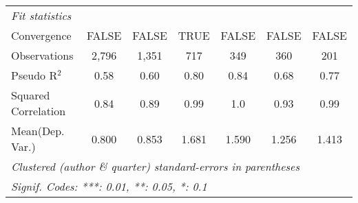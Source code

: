 \begin{tabular}{lcccccc}
   \emph{Fit statistics}\\
   Convergence                                                &FALSE    & FALSE         & TRUE         & FALSE  & FALSE         & FALSE\\  
   Observations                                               & 2,796   & 1,351         & 717          & 349    & 360           & 201\\  
   Pseudo R$^2$                                               & 0.58    & 0.60          & 0.80         & 0.84   & 0.68          & 0.77\\  
   Squared Correlation                                        & 0.84    & 0.89          & 0.99         & 1.0    & 0.93          & 0.99\\  
Mean(Dep. Var.) & 0.800 & 0.853 & 1.681 & 1.590 & 1.256 & 1.413 \\
   \midrule \midrule
   \multicolumn{7}{l}{\emph{Clustered (author \& quarter) standard-errors in parentheses}}\\
   \multicolumn{7}{l}{\emph{Signif. Codes: ***: 0.01, **: 0.05, *: 0.1}}\\
\end{tabular}
\par\endgroup
